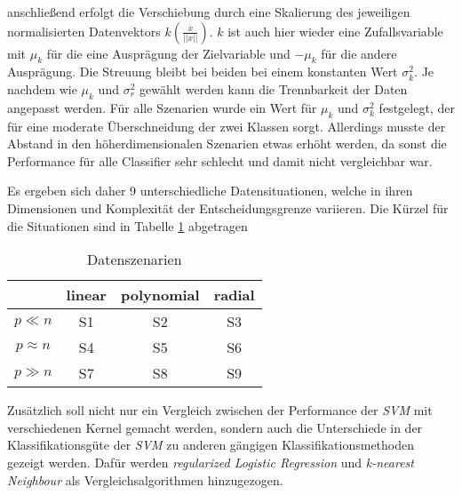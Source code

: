 \documentclass[
]{article}
\begin{document}
anschließend erfolgt die Verschiebung durch eine Skalierung des
jeweiligen normalisierten Datenvektors
\(k\left(\frac{\overline{x}}{||x||}\right)\). \(k\) ist auch hier wieder
eine Zufallsvariable mit \(\mu_k\) für die eine Ausprägung der
Zielvariable und \(-\mu_k\) für die andere Ausprägung. Die Streuung
bleibt bei beiden bei einem konstanten Wert \(\sigma^2_k\). Je nachdem
wie \(\mu_k\) und \(\sigma^2_r\) gewählt werden kann die Trennbarkeit
der Daten angepasst werden. Für alle Szenarien wurde ein Wert für
\(\mu_k\) und \(\sigma^2_k\) festgelegt, der für eine moderate
Überschneidung der zwei Klassen sorgt. Allerdings musste der Abstand in
den höherdimensionalen Szenarien etwas erhöht werden, da sonst die
Performance für alle Classifier sehr schlecht und damit nicht
vergleichbar war.

Es ergeben sich daher 9 unterschiedliche Datensituationen, welche in
ihren Dimensionen und Komplexität der Entscheidungsgrenze variieren. Die
Kürzel für die Situationen sind in Tabelle \ref{tab:datensituationen}
abgetragen

\begin{table}[H]
\begin{center}
\begin{tabular}{ |c|c|c|c| }
 \hline
  & linear & polynomial & radial \\
 \hline
 $p \ll n$ & S1 & S2 & S3 \\
 \hline
 $p \approx n$ & S4 & S5 & S6 \\
 \hline
 $p \gg n$ & S7 & S8 & S9 \\
 \hline
\end{tabular}
\end{center}
\caption{Datenszenarien}
\label{tab:datensituationen}
\end{table}

Zusätzlich soll nicht nur ein Vergleich zwischen der Performance der
\textit{SVM} mit verschiedenen Kernel gemacht werden, sondern auch die
Unterschiede in der Klassifikationsgüte der \textit{SVM} zu anderen
gängigen Klassifikationsmethoden gezeigt werden. Dafür werden
\textit{regularized Logistic Regression} und
\textit{k-nearest Neighbour} als Vergleichsalgorithmen hinzugezogen.

\printbibliography
\end{document}
